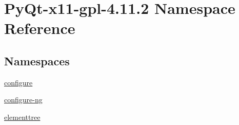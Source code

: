 \hypertarget{namespacePyQt-x11-gpl-4_811_82}{}\section{Py\+Qt-\/x11-\/gpl-\/4.11.2 Namespace Reference}
\label{namespacePyQt-x11-gpl-4_811_82}
\subsection*{Namespaces}
\begin{DoxyCompactItemize}
\item 
 \hyperlink{namespacePyQt-x11-gpl-4_811_82_1_1configure}{configure}
\item 
 \hyperlink{namespacePyQt-x11-gpl-4_811_82_1_1configure-ng}{configure-\/ng}
\item 
 \hyperlink{namespacePyQt-x11-gpl-4_811_82_1_1elementtree}{elementtree}
\end{DoxyCompactItemize}
